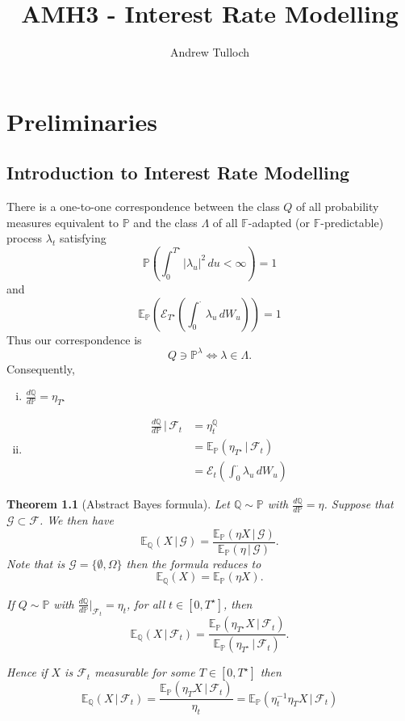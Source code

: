 \documentclass[10pt, oneside, reqno]{amsbook}
\title{AMH3 - Interest Rate Modelling}								%
\author{Andrew Tulloch}
\theoremstyle{plain}%
\newtheorem{thm}{Theorem}[chapter]
\theoremstyle{definition}
\theoremstyle{remark}
\newcommand{\given}{ \, | \,}
\newcommand{\sigf}{\mathcal{F}}
\newcommand{\Q}{\mathbb{Q}}
\newcommand{\E}{\mathbb{E}}
\renewcommand{\P}{\mathbb{P}}
\newcommand{\F}{\mathbb{F}}
\newcommand{\sigg}{\mathcal{G}}
\newcommand{\doleans}[1]{\mathcal E_t \left(\int_0^\cdot #1 \right)}
\numberwithin{equation}{chapter}
\begin{document}
\maketitle \tableofcontents \clearpage


\tableofcontents

\chapter{Preliminaries} %
\label{cha:preliminaries}

\section{Introduction to Interest Rate Modelling} %
\label{sec:introduction_to_interest_rate_modelling}

There is a one-to-one correspondence between the class $Q$ of all probability measures equivalent to $\P$ and the class $\Lambda$ of all $\F$-adapted (or $\F$-predictable) process $\lambda_t$ satisfying \[
	\P\left(\int_0^{T^\star} |\lambda_u|^2 \, du < \infty \right) = 1
\]
and \[
	\E_\P\left( \mathcal{E}_{T^\star} \left(\int_0^\cdot \lambda_u \, dW_u\right) \right) = 1
\] 
Thus our correspondence is \[Q \ni \P^\lambda \iff \lambda \in \Lambda.\]
Consequently, \begin{enumerate}[(i)]
	\item $\frac{d\Q}{d\P} = \eta_{T^\star}$
	\item \begin{align*}
		\frac{d\Q}{d\P} \given \sigf_t 	&= \eta^\Q_t \\
										&= \E_\P\left(\eta_{T^\star} \given \sigf_t \right) \\
										&= \doleans{\lambda_u \, dW_u}
	\end{align*}
\end{enumerate}

\begin{thm}[Abstract Bayes formula]
	Let $\Q \sim \P$ with $\frac{d \Q}{d \P} = \eta$.  Suppose that $\sigg \subset \sigf$.  We then have \[
		\E_\Q(X \given \sigg) = \frac{\E_\P(\eta X \given \sigg)}{\E_\P(\eta \given \sigg)}.
	\]  Note that is $\sigg = \{ \emptyset, \Omega \}$ then the formula reduces to \[
		\E_\Q(X) = \E_\P(\eta X).
	\]

	If $Q \sim \P$ with $\frac{d\Q}{d\P} |_{\sigf_t} = \eta_t$, for all $t \in [0, T^\star]$, then \[
		\E_\Q(X \given \sigf_t) = \frac{\E_\P(\eta_{T^\star} X \given \sigf_t)}{\E_\P(\eta_{T^\star} \given \sigf_t)}.
	\]
	
	Hence if $X$ is $\sigf_t$ measurable for some $T \in [0, T^\star]$ then \[
		\E_\Q(X \given \sigf_t) = \frac{\E_\P(\eta_T X \given \sigf_t)}{\eta_t} = \E_\P(\eta_t^{-1} \eta_T X \given \sigf_t)
	\]
\end{thm}
\end{document}
